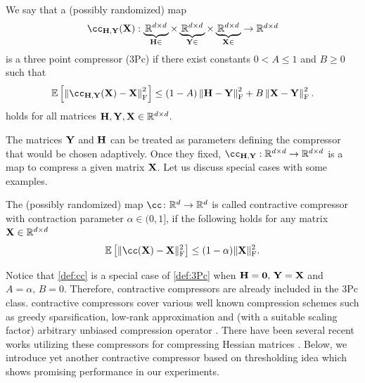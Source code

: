 \documentclass[11pt]{article}
\begin{document}
	
	\begin{definition}
		We say that a (possibly randomized) map
		\begin{equation}\label{def:3Pc}
			\textstyle
			\cc_{\mH, \mY}(\mX): \underbrace{\,\R^{d\times d}\,}_{\mH\in} \times \underbrace{\,\R^{d\times d}\,}_{\mY\in} \times \underbrace{\,\R^{d\times d}\,}_{\mX\in} \to \R^{d\times d}
		\end{equation}
		is a three point compressor (3Pc) if there exist constants $0 < A\leq 1$ and $B \geq 0$ such that
		\begin{equation}\label{def:3Pc_comp}
			\ExpBr{\norm{\cc_{\mH,\mY}(\mX) - \mX}^2_{\rm F}} \leq (1-A)\norm{\mH-\mY}^2_{\rm F} + B\norm{\mX-\mY}^2_{\rm F}.
		\end{equation}
		holds for all matrices $\mathbf{H}, \mathbf{Y}, \mathbf{X} \in \mathbb{R}^{d\times d}$.
	\end{definition}
	
	The matrices $\mathbf{Y}$ and $\mathbf{H}$ can be treated as parameters defining the compressor that would be chosen adaptively. Once they fixed, $\cc_{\mH,\mY}:\R^{d\times d} \to \R^{d\times d}$ is a map to compress a given matrix $\mathbf{X}$. Let us discuss special cases with some examples.
	
	
	
	\begin{example} The (possibly randomized) map $\cc\colon\R^d\to\R^d$ is called contractive compressor with contraction parameter $\alpha\in(0,1]$, if the following holds for any matrix $\mathbf{X}\in\mathbb{R}^{d\times d}$
		\begin{equation}\label{def:cc}
			\ExpBr{\|\cc(\mX) - \mX\|^2_{\rm F}} \le (1-\alpha)\|\mX\|^2_{\rm F}.
		\end{equation}
	\end{example}
	
	Notice that \eqref{def:cc} is a special case of \eqref{def:3Pc} when $\mathbf{H}=\bm{0},\, \mathbf{Y}=\mathbf{X}$ and $A=\alpha,\, B=0$. Therefore, contractive compressors are already included in the 3Pc class. contractive compressors cover various well known compression schemes such as greedy sparsification, low-rank approximation and (with a suitable scaling factor) arbitrary unbiased compression operator \citep{biased2020}. There have been several recent works utilizing these compressors for compressing Hessian matrices \citep{DAN-LA2020,Alimisis2021QNewton,Islamov2021NewtonLearn,FedNL2021,qian2021basis,IOSFabbro2022}. Below, we introduce yet another contractive compressor based on thresholding idea which shows promising performance in our experiments.
	
\end{document}

